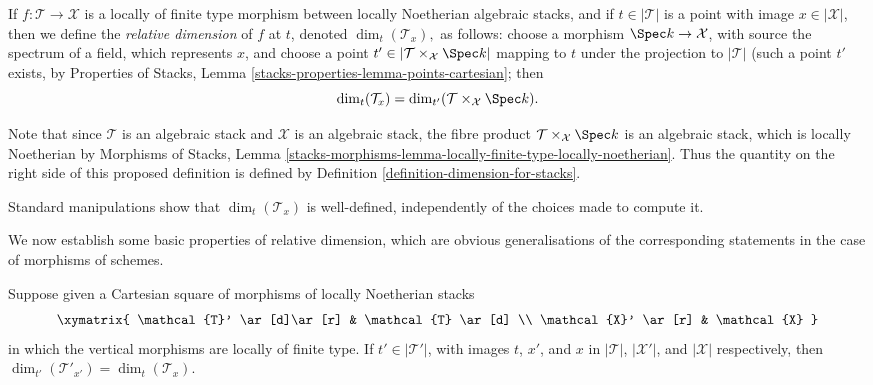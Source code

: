 \begin{definition}
\label{definition-relative-dimension-for-stacks}
If $f : \mathcal{T} \to \mathcal{X}$
is a locally of finite type morphism between
locally Noetherian algebraic stacks, and if
$t \in |\mathcal{T}|$ is a point with image $x \in |\mathcal{X}|$, then
we define the {\it relative dimension} of $f$ at $t$, denoted
$\dim_t(\mathcal{T}_x),$ as follows:
choose a morphism $\Spec k \to \mathcal{X}$, with source the spectrum of
a field, which represents $x$, and choose a point
$t' \in |\mathcal{T} \times_{\mathcal{X}} \Spec k|$
mapping to $t$ under the projection to $|\mathcal{T}|$
(such a point $t'$ exists, by
Properties of Stacks, Lemma
\ref{stacks-properties-lemma-points-cartesian}; then
$$
\dim_t(\mathcal{T}_x) = \dim_{t'}(\mathcal{T} \times_{\mathcal{X}} \Spec k ).
$$
\end{definition}

\noindent
Note that since $\mathcal{T}$ is an algebraic stack and $\mathcal{X}$ is an
algebraic stack,
the fibre product $\mathcal{T}\times_{\mathcal{X}} \Spec k$
is an algebraic stack, which is locally Noetherian by
Morphisms of Stacks, Lemma
\ref{stacks-morphisms-lemma-locally-finite-type-locally-noetherian}.
Thus the quantity on the right side of this proposed definition
is defined by Definition \ref{definition-dimension-for-stacks}.

\begin{remark}
\label{remark-dimension-tangent-space-well-defined}
Standard manipulations show that $\dim_t(\mathcal{T}_x)$ is well-defined,
independently of the choices made to compute it.
\end{remark}

\noindent
We now establish some basic properties of relative dimension, which
are obvious generalisations of the corresponding statements in the
case of morphisms of schemes.

\begin{lemma}
\label{lemma-base-change-invariance-of-relative-dimension}
Suppose given
a Cartesian square of morphisms of locally Noetherian stacks
$$
\xymatrix{
\mathcal{T}' \ar[d]\ar[r] & \mathcal{T} \ar[d] \\
\mathcal{X}' \ar[r] & \mathcal{X}
}
$$
in which the vertical morphisms are locally of finite type.
If $t' \in |\mathcal{T}'|$,
with images $t$, $x'$, and $x$ in $|\mathcal{T}|$, $|\mathcal{X}'|$, and
$|\mathcal{X}|$
respectively, then $\dim_{t'}(\mathcal{T}'_{x'}) = \dim_{t}(\mathcal{T}_x).$
\end{lemma}

